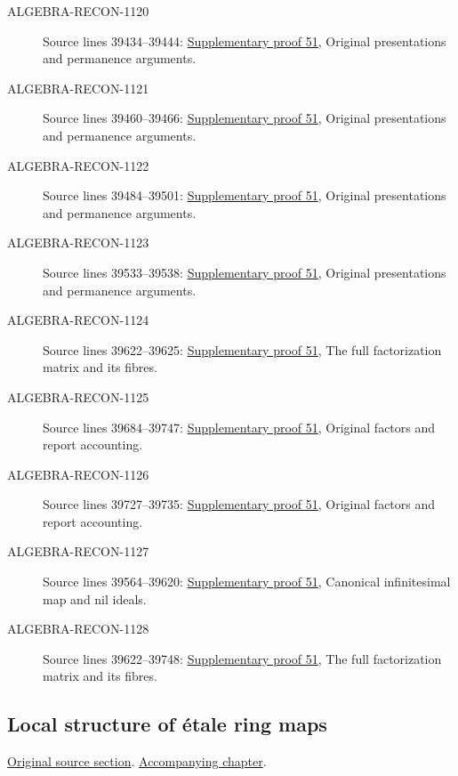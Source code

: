 \begin{description}
\item[ALGEBRA-RECON-1120] Source lines 39434--39444: \hyperlink{algebra_etale_notes_20260928}{Supplementary proof 51}, Original presentations and permanence arguments.
\item[ALGEBRA-RECON-1121] Source lines 39460--39466: \hyperlink{algebra_etale_notes_20260928}{Supplementary proof 51}, Original presentations and permanence arguments.
\item[ALGEBRA-RECON-1122] Source lines 39484--39501: \hyperlink{algebra_etale_notes_20260928}{Supplementary proof 51}, Original presentations and permanence arguments.
\item[ALGEBRA-RECON-1123] Source lines 39533--39538: \hyperlink{algebra_etale_notes_20260928}{Supplementary proof 51}, Original presentations and permanence arguments.
\item[ALGEBRA-RECON-1124] Source lines 39622--39625: \hyperlink{algebra_etale_notes_20260928}{Supplementary proof 51}, The full factorization matrix and its fibres.
\item[ALGEBRA-RECON-1125] Source lines 39684--39747: \hyperlink{algebra_etale_notes_20260928}{Supplementary proof 51}, Original factors and report accounting.
\item[ALGEBRA-RECON-1126] Source lines 39727--39735: \hyperlink{algebra_etale_notes_20260928}{Supplementary proof 51}, Original factors and report accounting.
\item[ALGEBRA-RECON-1127] Source lines 39564--39620: \hyperlink{algebra_etale_notes_20260928}{Supplementary proof 51}, Canonical infinitesimal map and nil ideals.
\item[ALGEBRA-RECON-1128] Source lines 39622--39748: \hyperlink{algebra_etale_notes_20260928}{Supplementary proof 51}, The full factorization matrix and its fibres.
\end{description}

\subsection{Local structure of \'etale ring maps}
\hypertarget{algebra-source-section-etale-local-structure}{}
\noindent\href{https://github.com/stacks/stacks-project/blob/a04446e57ec1fbc252a871afcec7752fb2807b14/algebra.tex\#L39754}{Original source section}. \href{algebra.pdf\#nameddest=section-etale-local-structure}{Accompanying chapter}.

